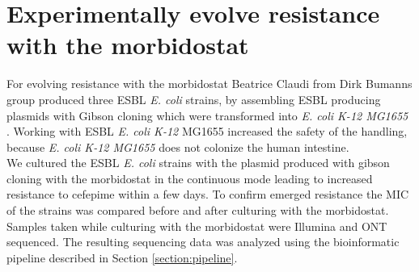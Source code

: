 \section{Experimentally evolve resistance with the morbidostat}
For evolving resistance with the morbidostat Beatrice Claudi from Dirk Bumanns group  produced three ESBL \textit{E. coli} strains, by assembling ESBL producing plasmids with Gibson cloning which were transformed into \textit{E. coli K-12 MG1655} \cite{bioz.com_bioz_nodate}. Working with ESBL \textit{E. coli K-12} MG1655 increased the safety of the handling, because \textit{E. coli K-12 MG1655} does not colonize the human intestine.\\
We cultured the ESBL \textit{E. coli} strains with the plasmid produced with gibson cloning with the morbidostat in the continuous mode leading to increased resistance to cefepime within a few days. To confirm emerged resistance the MIC of the strains was compared before and after culturing with the morbidostat. Samples taken while culturing with the morbidostat were Illumina and ONT sequenced. The resulting sequencing data was analyzed using the bioinformatic pipeline described in Section \ref{section:pipeline}.

